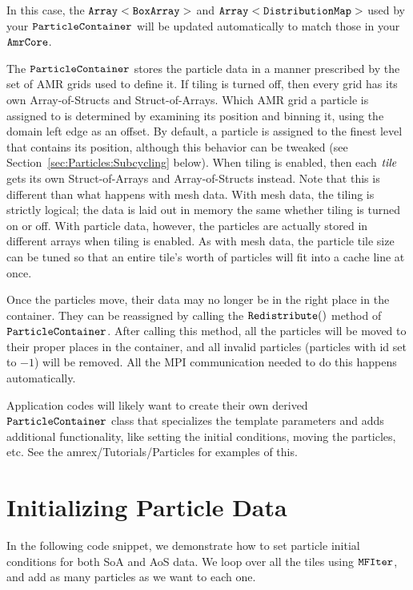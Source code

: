 In this case, the $\tt{Array<BoxArray>}$ and $\tt{Array<DistributionMap>}$ used by your $\tt{ParticleContainer}$ will be updated automatically to match those in
your $\tt{AmrCore}$. 

The $\tt{ParticleContainer}$ stores the particle data in a manner prescribed by the set of AMR grids used to define it. If tiling is turned off, then every grid has its own 
Array-of-Structs and Struct-of-Arrays. Which AMR grid a particle is assigned to is determined by examining its position and binning it, using the domain left edge as an offset. 
By default, a particle is assigned to the finest level that contains its position, although this behavior can be tweaked (see Section~\ref{sec:Particles:Subcycling} below). 
When tiling is enabled, then each $\emph{tile}$ gets its own Struct-of-Arrays and Array-of-Structs instead. Note that this is different than what happens with mesh data. With mesh
data, the tiling is strictly logical; the data is laid out in memory the same whether tiling is turned on or off. With particle data, however, the particles are actually stored in 
different arrays when tiling is enabled. As with mesh data, the particle tile size can be tuned so that an entire tile's worth of particles will fit into a cache line at once.

Once the particles move, their data may no longer be in the right place in the container. They can be reassigned by calling the $\tt{Redistribute()}$ method of $\tt{ParticleContainer}$.
After calling this method, all the particles will be moved to their proper places in the container, and all invalid particles (particles with id set to $-1$) will be removed. All the 
MPI communication needed to do this happens automatically.

Application codes will likely want to create their own derived $\tt{ParticleContainer}$ class that specializes the template parameters and adds additional 
functionality, like setting the initial conditions, moving the particles, etc. See the amrex/Tutorials/Particles for examples of this.

\section{Initializing Particle Data}
\label{sec:Particles:Initializing}

In the following code snippet, we demonstrate how to set particle initial conditions for both SoA and AoS data. We loop over all the tiles using $\tt{MFIter}$, and add
as many particles as we want to each one.

